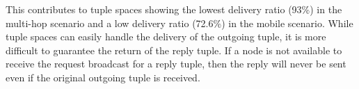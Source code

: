 \documentclass[lnicst]{svmultln}
\begin{document}
This contributes to tuple spaces showing the lowest delivery ratio (93\%) in the multi-hop scenario and a low delivery ratio (72.6\%) in the mobile scenario. While tuple spaces can easily handle the delivery of the outgoing tuple, it is more difficult to guarantee the return of the reply tuple. If a node is not available to receive the request broadcast for a reply tuple, then the reply will never be sent even if the original outgoing tuple is received.

%	

\end{document}
